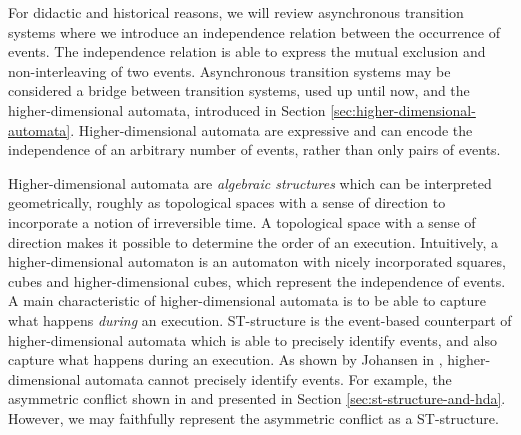 

For didactic and historical reasons, we will review asynchronous transition systems where we introduce an independence relation between the occurrence of events. The independence relation is able to express the mutual exclusion and non-interleaving of two events. Asynchronous transition systems may be considered a bridge between transition systems, used up until now, and the higher-dimensional automata, introduced in Section \ref{sec:higher-dimensional-automata}. Higher-dimensional automata are expressive and can encode the independence of an arbitrary number of events, rather than only pairs of events.

Higher-dimensional automata are \emph{algebraic structures} which can be interpreted geometrically, roughly as topological spaces with a sense of direction to incorporate a notion of irreversible time. A topological space with a sense of direction makes it possible to determine the order of an execution. Intuitively, a higher-dimensional automaton is an automaton with nicely incorporated squares, cubes and higher-dimensional cubes, which represent the independence of events. A main characteristic of higher-dimensional automata is to be able to capture what happens \emph{during} an execution. ST-structure is the event-based counterpart of higher-dimensional automata which is able to precisely identify events, and also capture what happens during an execution. As shown by Johansen in \cite{Johansen16STstruct}, higher-dimensional automata cannot precisely identify events. For example, the asymmetric conflict shown in \cite[Figure 5]{Johansen16STstruct} and presented in Section \ref{sec:st-structure-and-hda}. However, we may faithfully represent the asymmetric conflict as a ST-structure.

